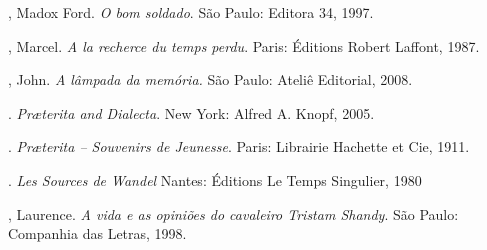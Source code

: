  \begin{bibliohedra}
 , Madox Ford. \textit{O bom soldado}. São Paulo: Editora 34, 1997.

 , Marcel. \textit{A la recherce du temps perdu}. Paris: Éditions
 Robert Laffont, 1987.

 , John. \textit{A lâmpada da memória.} São Paulo: Ateliê Editorial, 2008.

 \titidem. \textit{Pr\ae terita and Dialecta}. New York: Alfred A. Knopf, 2005.

 \titidem. \textit{Pr\ae terita -- Souvenirs de Jeunesse}. Paris: Librairie Hachette et Cie, 1911.

 \titidem. \textit{Les Sources de Wandel} Nantes: Éditions Le Temps Singulier, 1980

 , Laurence. \textit{A vida e as opiniões do cavaleiro Tristam
 Shandy}. São Paulo: Companhia das Letras, 1998.
 \end{bibliohedra}
